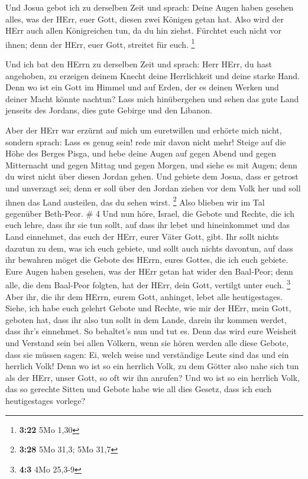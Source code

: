  Und Josua gebot ich zu derselben Zeit und sprach: Deine
Augen haben gesehen alles, was der HErr, euer Gott, diesen zwei Königen
getan hat. Also wird der HErr auch allen Königreichen tun, da du hin
ziehst.  Fürchtet euch nicht vor ihnen; denn der HErr, euer
Gott, streitet für euch. \footnote{\textbf{3:22} 5Mo 1,30}

 Und ich bat den HErrn zu derselben Zeit und sprach:
 Herr HErr, du hast angehoben, zu erzeigen deinem Knecht
deine Herrlichkeit und deine starke Hand. Denn wo ist ein Gott im Himmel
und auf Erden, der es deinen Werken und deiner Macht könnte nachtun?
 Lass mich hinübergehen und sehen das gute Land jenseits
des Jordans, dies gute Gebirge und den Libanon.

 Aber der HErr war erzürnt auf mich um euretwillen und
erhörte mich nicht, sondern sprach: Lass es genug sein! rede mir davon
nicht mehr!  Steige auf die Höhe des Berges Pisga, und hebe
deine Augen auf gegen Abend und gegen Mitternacht und gegen Mittag und
gegen Morgen, und siehe es mit Augen; denn du wirst nicht über diesen
Jordan gehen.  Und gebiete dem Josua, dass er getrost und
unverzagt sei; denn er soll über den Jordan ziehen vor dem Volk her und
soll ihnen das Land austeilen, das du sehen wirst. \footnote{\textbf{3:28}
  5Mo 31,3; 5Mo 31,7}  Also blieben wir im Tal gegenüber
Beth-Peor. \# 4  Und nun höre, Israel, die Gebote und
Rechte, die ich euch lehre, dass ihr sie tun sollt, auf dass ihr lebet
und hineinkommet und das Land einnehmet, das euch der HErr, eurer Väter
Gott, gibt.  Ihr sollt nichts dazutun zu dem, was ich euch
gebiete, und sollt auch nichts davontun, auf dass ihr bewahren möget die
Gebote des HErrn, eures Gottes, die ich euch gebiete.  Eure
Augen haben gesehen, was der HErr getan hat wider den Baal-Peor; denn
alle, die dem Baal-Peor folgten, hat der HErr, dein Gott, vertilgt unter
euch. \footnote{\textbf{4:3} 4Mo 25,3-9}  Aber ihr, die ihr
dem HErrn, eurem Gott, anhinget, lebet alle heutigestages. 
Siehe, ich habe euch gelehrt Gebote und Rechte, wie mir der HErr, mein
Gott, geboten hat, dass ihr also tun sollt in dem Lande, darein ihr
kommen werdet, dass ihr's einnehmet.  So behaltet's nun und
tut es. Denn das wird eure Weisheit und Verstand sein bei allen Völkern,
wenn sie hören werden alle diese Gebote, dass sie müssen sagen: Ei,
welch weise und verständige Leute sind das und ein herrlich Volk!
 Denn wo ist so ein herrlich Volk, zu dem Götter also nahe
sich tun als der HErr, unser Gott, so oft wir ihn anrufen? 
Und wo ist so ein herrlich Volk, das so gerechte Sitten und Gebote habe
wie all dies Gesetz, dass ich euch heutigestages vorlege?


